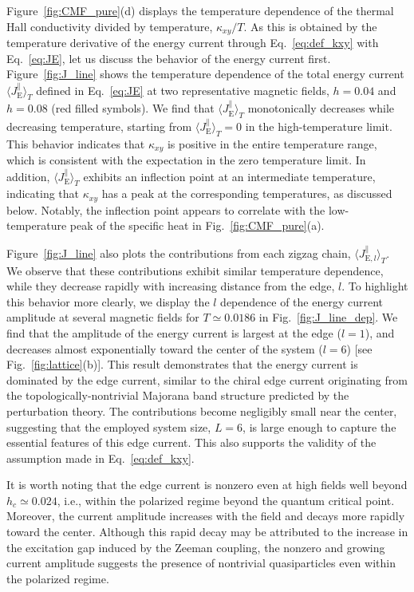 \documentclass[twocolumn,superscriptaddress,showpacs, longbibliography, aps, prx]{revtex4-2}
\begin{document}
Figure~\ref{fig:CMF_pure}(d) displays the temperature dependence of the thermal Hall conductivity divided by temperature, $\kappa_{xy}/T$. 
As this is obtained by the temperature derivative of the energy current through Eq.~\eqref{eq:def_kxy} with Eq.~\eqref{eq:JE}, let us discuss the behavior of the energy current first. 
Figure~\ref{fig:J_line} shows the temperature dependence of the total energy current $\langle J_{\mathrm{E}}^\parallel \rangle_T$ defined in Eq.~\eqref{eq:JE} at two representative magnetic fields, $h=0.04$ and $h=0.08$ (red filled symbols). 
We find that $\langle J_{\mathrm{E}}^\parallel \rangle_T$ monotonically decreases while decreasing temperature, starting from $\langle J_{\mathrm{E}}^{\parallel} \rangle_T =0$ in the high-temperature limit. This behavior indicates that $\kappa_{xy}$ is positive in the entire temperature range, which is consistent with the expectation in the zero temperature limit. 
In addition, $\langle J_{\mathrm{E}}^\parallel \rangle_T$ exhibits an inflection point at an intermediate temperature, indicating that $\kappa_{xy}$ has a peak at the corresponding temperatures, as discussed below. 
Notably, the inflection point appears to correlate with the low-temperature peak of the specific heat in Fig.~\ref{fig:CMF_pure}(a). 

Figure~\ref{fig:J_line} also plots the contributions from each zigzag chain, $\langle J_{\mathrm{E},l}^\parallel \rangle_T$. 
We observe that these contributions exhibit similar temperature dependence, while they decrease rapidly with increasing distance from the edge, $l$. 
To highlight this behavior more clearly, we display the $l$ dependence of the energy current amplitude at several magnetic fields for $T\simeq 0.0186$ in Fig.~\ref{fig:J_line_dep}. 
We find that the amplitude of the energy current is largest at the edge ($l=1$), and decreases almost exponentially toward the center of the system ($l=6$) [see Fig.~\ref{fig:lattice}(b)]. 
This result demonstrates that the energy current is dominated by the edge current, similar to the chiral edge current originating from the topologically-nontrivial Majorana band structure predicted by the perturbation theory.
The contributions become negligibly small near the center, suggesting that the employed system size, $L=6$, is large enough to capture the essential features of this edge current.
This also supports the validity of the assumption made in Eq.~\eqref{eq:def_kxy}. 

It is worth noting that the edge current is nonzero even at high fields well beyond $h_c \simeq 0.024$, i.e., within the polarized regime beyond the quantum critical point. 
Moreover, the current amplitude increases with the field and decays more rapidly toward the center. 
Although this rapid decay may be attributed to the increase in the excitation gap induced by the Zeeman coupling, the nonzero and growing current amplitude suggests the presence of nontrivial quasiparticles even within the polarized regime.
\end{document}
